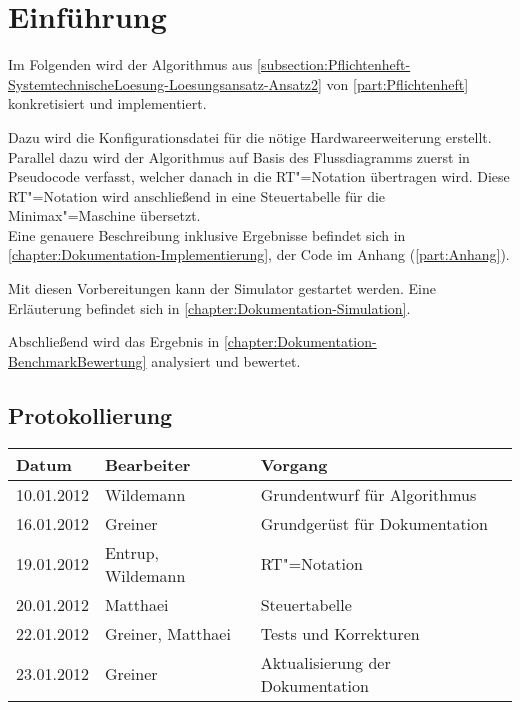 \chapter{Einführung}
\label{chapter:Dokumentation-Einfuehrung}

Im Folgenden wird der Algorithmus aus \autoref{subsection:Pflichtenheft-SystemtechnischeLoesung-Loesungsansatz-Ansatz2} von \autoref{part:Pflichtenheft} konkretisiert und implementiert.

Dazu wird die Konfigurationsdatei für die nötige Hardwareerweiterung erstellt. Parallel dazu wird der Algorithmus auf Basis des Flussdiagramms zuerst in Pseudocode verfasst, welcher danach in die RT"=Notation übertragen wird. Diese RT"=Notation wird anschließend in eine Steuertabelle für die Minimax"=Maschine übersetzt.\\
Eine genauere Beschreibung inklusive Ergebnisse befindet sich in \autoref{chapter:Dokumentation-Implementierung}, der Code im Anhang (\autoref{part:Anhang}).

Mit diesen Vorbereitungen kann der Simulator gestartet werden. Eine Erläuterung befindet sich in \autoref{chapter:Dokumentation-Simulation}.

Abschließend wird das Ergebnis in \autoref{chapter:Dokumentation-BenchmarkBewertung} analysiert und bewertet.


\section{Protokollierung}
\label{section:Dokumentation-Einfuehrung-Protokollierung}

\begin{tabularx}{\textwidth}{|l|l|X|}
    \hline
    Datum & Bearbeiter & Vorgang \\
    \hline
    \hline
    10.01.2012 & Wildemann & Grundentwurf für Algorithmus \\
    \hline
    16.01.2012 & Greiner & Grundgerüst für Dokumentation \\
    \hline
    19.01.2012 & Entrup, Wildemann & RT"=Notation \\
    \hline
    20.01.2012 & Matthaei & Steuertabelle \\
    \hline
    22.01.2012 & Greiner, Matthaei & Tests und Korrekturen \\
    \hline
    23.01.2012 & Greiner & Aktualisierung der Dokumentation\\
    \hline
\end{tabularx}